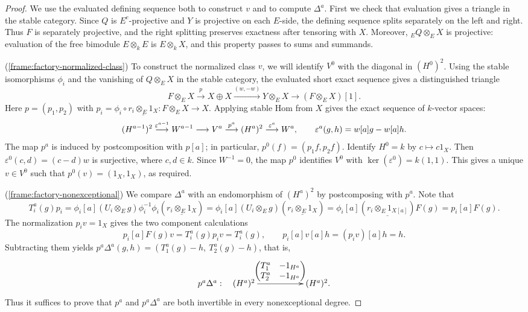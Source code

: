 \documentclass[11pt]{article}
\begin{document}
\begin{proof}
We use the evaluated defining sequence both to construct $v$ and to compute $\Delta^a$. First we check that evaluation gives a triangle in the stable category. Since $Q$ is $E^e$-projective and $Y$ is projective on each $E$-side, the defining sequence splits separately on the left and right. Thus $F$ is separately projective, and the right splitting preserves exactness after tensoring with $X$.
Moreover, ${_E}Q\otimes_E X$ is projective: evaluation of the free bimodule $E\otimes_kE$ is
$E\otimes_kX$, and this property passes to sums and summands.

\textup{(\ref{frame:factory-normalized-class})}
To construct the normalized class $v$, we will identify $V^0$
with the diagonal in $(H^0)^2$.
Using the stable isomorphisms $\phi_i$ and the vanishing of
$Q\otimes_E X$ in the stable category, the evaluated short
exact sequence gives a distinguished triangle
\[
 F\otimes_E X\xrightarrow{p}X\oplus X
    \xrightarrow{(w,-w)}Y\otimes_E X
    \longrightarrow(F\otimes_E X)[1].
\]
Here $p=(p_1,p_2)$ with $p_i=\phi_i\circ\underline{r_i\otimes_E1_X}:F\otimes_EX\to X$.
Applying stable Hom from $X$ gives the exact sequence of $k$-vector spaces:
\begin{equation*}
(H^{a-1})^2\stackrel{\varepsilon^{a-1}}{\longrightarrow}W^{a-1}\longrightarrow V^a\stackrel{p^a}{\longrightarrow}(H^a)^2\stackrel{\varepsilon^a}{\longrightarrow}W^a,
\qquad\varepsilon^a(g,h)=w[a]g-w[a]h.
\end{equation*}
The map $p^a$ is induced by postcomposition with $p[a]$; in particular, $p^0(f)=(p_1f,p_2f)$.
Identify $H^0=k$ by $c\mapsto c1_X$. Then
$\varepsilon^0(c,d)=(c-d)w$ is surjective, where $c,d\in k$.
Since $W^{-1}=0$, the map $p^0$ identifies $V^0$ with $\ker(\varepsilon^0)=k(1,1)$. This gives a unique $v\in V^0$ such that $p^0(v)=(1_X,1_X)$, as required.

\textup{(\ref{frame:factory-nonexceptional})}
We compare $\Delta^a$ with an endomorphism of $(H^a)^2$ by
postcomposing with $p^a$.
Note that
$$T_i^a(g)p_i=\phi_i[a](U_i\otimes_Eg)\phi_i^{-1}\phi_i(\underline{r_i\otimes_E1_X})
=\phi_i[a](U_i\otimes_Eg)(\underline{r_i\otimes_E1_X})
=\phi_i[a](\underline{r_i\otimes_E1_{X[a]}})F(g)=p_i[a]F(g).$$
The normalization $p_iv=1_X$ gives the two component calculations
\[
 p_i[a]F(g)v=T_i^a(g)p_iv=T_i^a(g),\qquad
 p_i[a]v[a]h=(p_iv)[a]h=h.
\]
Subtracting them yields $p^a\Delta^a(g,h)=(T_1^a(g)-h,\ T_2^a(g)-h)$, that is,
$$
\xymatrix{
p^a\Delta^a:\quad(H^a)^2\ar[rr]^-{\scriptstyle\begin{pmatrix}T_1^a&-1_{H^a}\\T_2^a&-1_{H^a}\end{pmatrix}}&&(H^a)^2.}
$$
Thus it suffices to prove that $p^a$ and $p^a\Delta^a$ are both invertible in every nonexceptional degree.


\end{proof}
\end{document}
